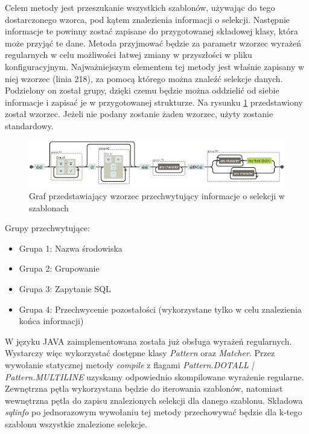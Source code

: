Celem metody jest przeszukanie wszystkich szablonów, używając do tego dostarczonego wzorca, pod kątem znalezienia informacji o selekcji. Następnie informacje te powinny zostać zapisane do przygotowanej składowej klasy, która może przyjąć te dane. 
Metoda przyjmować będzie za parametr wzorzec wyrażeń regularnych w celu możliwości łatwej zmiany w przyszłości w pliku konfiguracyjnym. 
Najważniejszym elementem tej metody jest właśnie zapisany w niej wzorzec (linia 218), za pomocą którego można znaleźć selekcje danych. Podzielony on został grupy, dzięki czemu będzie można oddzielić od siebie informacje i zapisać je w przygotowanej strukturze. Na rysunku \ref{fig:Wzorzec} przedstawiony został wzorzec. Jeżeli nie podany zostanie żaden wzorzec, użyty zostanie standardowy. 
\begin{figure}[h]
    \centering
    \includegraphics[width=1\textwidth]{rys/implementacja/regex.png}
    \caption{Graf przedstawiający wzorzec przechwytujący informacje o selekcji w szablonach}
    \label{fig:Wzorzec}
\end{figure}
\par
Grupy przechwytujące:
\begin{itemize}
\item Grupa 1: Nazwa środowiska
\item Grupa 2: Grupowanie
\item Grupa 3: Zapytanie SQL
\item Grupa 4: Przechwycenie pozostałości (wykorzystane tylko w celu znalezienia końca informacji)
\end{itemize}
\vspace{5mm}
 \par
W języku JAVA zaimplementowana została już obsługa wyrażeń regularnych. Wystarczy więc wykorzystać dostępne klasy \emph{Pattern} oraz \emph{Matcher}. Przez wywołanie statycznej metody \emph{compile} z flagami \emph{Pattern.DOTALL | Pattern.MULTILINE} uzyskamy odpowiednio skompilowane wyrażenie regularne. Zewnętrzna pętla wykorzystana będzie do iterowania szablonów, natomiast wewnętrzna pętla do zapisu znalezionych selekcji dla danego szablonu. Składowa \emph{sqlinfo} po jednorazowym wywołaniu tej metody przechowywać będzie dla k-tego szablonu wszystkie znalezione selekcje.

